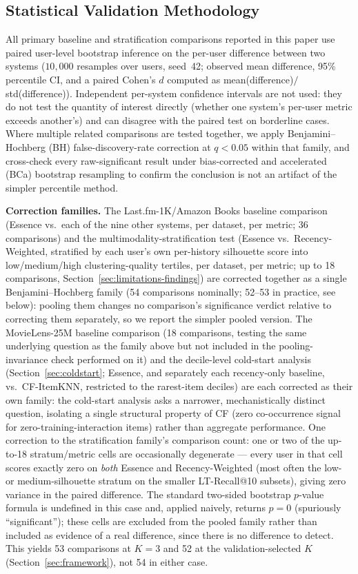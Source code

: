 \documentclass[11pt,a4paper]{article}
\begin{document}
\subsection{Statistical Validation Methodology}
\label{sec:stats-methodology}

All primary baseline and stratification comparisons reported in this
paper use paired user-level bootstrap inference on the per-user difference between two systems
($10{,}000$ resamples over users, seed~42; observed mean difference, 95\%
percentile CI, and a paired Cohen's $d$ computed as
mean(difference)$/$std(difference)). Independent per-system confidence
intervals are not used: they do not test the quantity of interest
directly (whether one system's per-user metric exceeds another's) and can
disagree with the paired test on borderline cases. Where multiple related comparisons are tested together,
we apply Benjamini--Hochberg (BH) false-discovery-rate correction at
$q<0.05$ within that family, and cross-check every raw-significant result
under bias-corrected and accelerated (BCa) bootstrap resampling to confirm
the conclusion is not an artifact of the simpler percentile method.

\textbf{Correction families.} The Last.fm-1K/Amazon Books baseline
comparison (Essence vs.\ each of the nine other systems, per dataset, per
metric; 36 comparisons) and the multimodality-stratification test
(Essence vs.\ Recency-Weighted, stratified by each user's own per-history
silhouette score into low/medium/high clustering-quality tertiles, per
dataset, per metric; up to 18 comparisons, Section~\ref{sec:limitations-findings})
are corrected together as a single Benjamini--Hochberg family (54
comparisons nominally; 52--53 in practice, see below): pooling them
changes no comparison's significance verdict relative to correcting them
separately, so we report the simpler pooled version. The MovieLens-25M
baseline comparison (18 comparisons, testing the same underlying
question as the family above but not included in the pooling-invariance
check performed on it) and the decile-level cold-start analysis (Section~\ref{sec:coldstart};
Essence, and separately each recency-only baseline, vs.\ CF-ItemKNN,
restricted to the rarest-item deciles) are each corrected as their own
family: the cold-start analysis asks a narrower, mechanistically distinct
question, isolating a single structural property of CF (zero
co-occurrence signal for zero-training-interaction items) rather than
aggregate performance. One correction to the stratification family's
comparison count: one or two of the up-to-18 stratum/metric cells are
occasionally degenerate --- every user in that cell scores exactly zero on
\emph{both} Essence and Recency-Weighted (most often the low- or
medium-silhouette stratum on the smaller LT-Recall@10 subsets), giving
zero variance in the paired difference. The standard two-sided bootstrap
$p$-value formula is undefined in this case and, applied naively, returns
$p=0$ (spuriously ``significant''); these cells are excluded from the
pooled family rather than included as evidence of a real difference,
since there is no difference to detect. This yields 53 comparisons at
$K=3$ and 52 at the validation-selected $K$ (Section~\ref{sec:framework}),
not 54 in either case.
\end{document}
